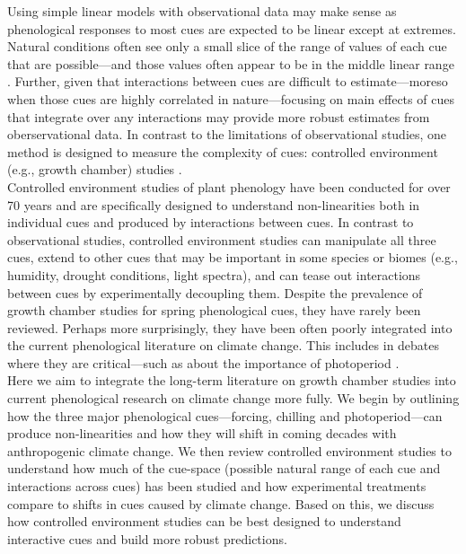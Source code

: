 \documentclass[11pt,letter]{article}
\begin{document}
Using simple linear models with observational data may make sense as phenological responses to most cues are expected to be linear except at extremes. Natural conditions often see only a small slice of the range of values of each cue that are possible---and those values often appear to be in the middle linear range \citep{gauzere2017,ettinger2020}. Further, given that interactions between cues are difficult to estimate---moreso when those cues are highly correlated in nature---focusing on main effects of cues that integrate over any interactions \citep{gelman2006} may provide more robust estimates from oberservational data.  In contrast to the limitations of observational studies, one method is designed to measure the complexity of cues: controlled environment (e.g., growth chamber) studies \citep{nagano2012,satake2013}.\\

Controlled environment studies of plant phenology have been conducted for over 70 years and are specifically designed to understand non-linearities both in individual cues and produced by interactions between cues. In contrast to observational studies, controlled environment studies can manipulate all three cues, extend to other cues that may be important in some species or biomes (e.g., humidity, drought conditions, light spectra), and can tease out interactions between cues by experimentally decoupling them. Despite the prevalence of growth chamber studies for spring phenological cues, they have rarely been reviewed. Perhaps more surprisingly, they have been often poorly integrated into the current phenological literature on climate change. This includes in debates where they are critical---such as about the importance of photoperiod \citep[e.g.,]{fu2015,richardson2018}.\\

Here we aim to integrate the long-term literature on growth chamber studies into current phenological research on climate change more fully. We begin by outlining how the three major phenological cues---forcing, chilling and photoperiod---can produce non-linearities and how they will shift in coming decades with anthropogenic climate change. We then review controlled environment studies to understand how much of the cue-space (possible natural range of each cue and interactions across cues) has been studied and how experimental treatments compare to shifts in cues caused by climate change. Based on this, we discuss how controlled environment studies can be best designed to understand interactive cues and build more robust predictions.\\ 
\end{document}
